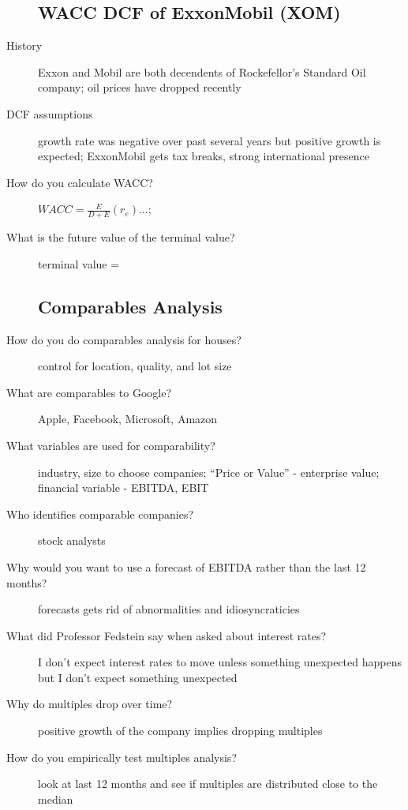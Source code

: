 \documentclass[11pt]{article}
\begin{document}
\begin{description}
\subsection{WACC DCF of ExxonMobil (XOM)}
\item[History]
  Exxon and Mobil are both decendents of Rockefellor's Standard Oil company;
  oil prices have dropped recently
\item[DCF assumptions]
  growth rate was negative over past several years but positive growth is expected;
  ExxonMobil gets tax breaks, strong international presence
\item[How do you calculate WACC?]
  $WACC = \frac{E}{D + E} (r_e)\dots$;
\item[What is the future value of the terminal value?]
  terminal value = 
\subsection{Comparables Analysis}
\item[How do you do comparables analysis for houses?]
  control for location, quality, and lot size
\item[What are comparables to Google?]
  Apple, Facebook, Microsoft, Amazon
\item[What variables are used for comparability?]
  industry, size to choose companies;
  ``Price or Value'' - enterprise value;
  financial variable - EBITDA, EBIT
\item[Who identifies comparable companies?]
  stock analysts
\item[Why would you want to use a forecast of EBITDA rather than the last 12 months?]
  forecasts gets rid of abnormalities and idiosyncraticies
\item[What did Professor Fedstein say when asked about interest rates?]
  I don't expect interest rates to move unless something unexpected happens but I don't expect something unexpected
\item[Why do multiples drop over time?]
  positive growth of the company implies dropping multiples
\item[How do you empirically test multiples analysis?]
  look at last 12 months and see if multiples are distributed close to the median
\end{description}
\end{document}
